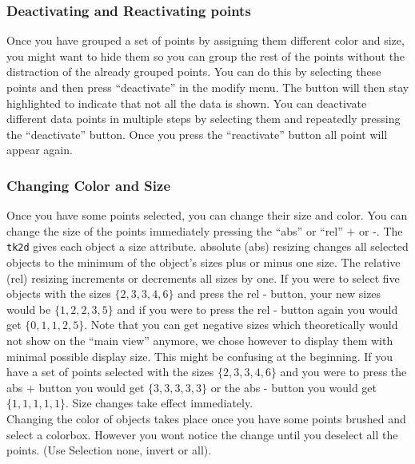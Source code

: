 \documentclass[12pt,oneside,titlepage,letter]{article}
\newcommand{\modify}[1]{{\color{blue}#1}}
\begin{document}
\subsubsection{Deactivating and Reactivating points}
Once you have grouped a set of points by assigning them different color and size, you might want to hide them so you can group the rest of the points without the distraction of the already grouped points. You can do this by selecting these points and then press ``deactivate'' in the modify menu. The button will then stay highlighted to indicate that not all the data is shown. You can deactivate different data points in multiple steps by selecting them and repeatedly pressing the ``deactivate'' button. Once you press the ``reactivate'' button all point will appear again.


 \subsubsection{Changing Color and Size}
Once you have some points selected, you can change their size and color. You can change the size of the points immediately pressing the ``abs'' or ``rel'' + or -. The \texttt{tk2d} gives each object a size attribute. absolute (abs) resizing changes all selected objects to the minimum of the object's sizes plus or minus one size. The relative (rel) resizing increments or decrements all sizes by one. If you were to select five objects with the sizes $\{2,3,3,4,6\}$ and press the rel - button, your new sizes would be $\{1,2,2,3,5\}$ and if you were to press the rel - button again you would get $\{0,1,1,2,5\}$. \modify{Note that you can get negative sizes which theoretically would not show on the ``main view'' anymore, we chose however to display them with minimal possible display size. This might be confusing at the beginning}. If you have a set of points selected with the sizes $\{2,3,3,4,6\}$ and you were to press the abs + button you would get $\{3,3,3,3,3\}$ or the abs - button you would get $\{1,1,1,1,1\}$. Size changes take effect immediately.\\

Changing the color of objects takes place once you have some points brushed and select a colorbox. However you wont notice the change until you deselect all the points. (Use Selection none, invert or all).
\end{document}
